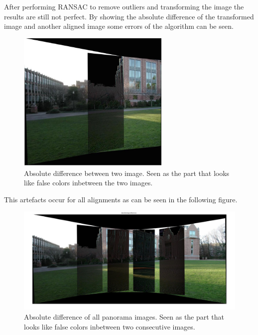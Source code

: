 \documentclass[subfigure,epsfig,fleqn,float,numbers=noenddot]{scrartcl}
\begin{document}
After performing RANSAC to remove outliers and transforming the image the results are still not perfect. By showing the absolute difference of the transformed image and another aligned image some errors of the algorithm can be seen.
\begin{figure}[H]
		\centering
		\includegraphics[width=0.65\textwidth]{./img/RANSACImDiffDetail.jpg}
		\caption{Absolute difference between two image. Seen as the part that looks like false colors inbetween the two images.}
		\label{img:absdiffdet}
\end{figure}

This artefacts occur for all alignments as can be seen in the following figure.

\begin{figure}[H]
		\centering
		\includegraphics[width=1\textwidth]{./img/RANSACImDiffTotal.jpg}
		\caption{Absolute difference of all panorama images. Seen as the part that looks like false colors inbetween two consecutive images.}
		\label{img:absdifftot}
\end{figure}
\end{document}
